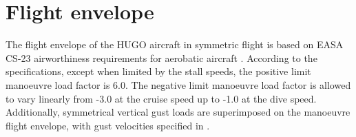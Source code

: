 \section{Flight envelope}
\label{sec:flight_envelope}
The flight envelope of the HUGO aircraft in symmetric flight is based on EASA CS-23 airworthiness requirements for aerobatic aircraft \cite{EASA_CS23_Am3_2012}. According to the specifications, except when limited by the stall speeds, the positive limit manoeuvre load factor is 6.0. The negative limit manoeuvre load factor is allowed to vary linearly from -3.0 at the cruise speed up to -1.0 at the dive speed. Additionally, symmetrical vertical gust loads are superimposed on the manoeuvre flight envelope, with gust velocities specified in  \cite{EASA_CS23_Am3_2012}. 

